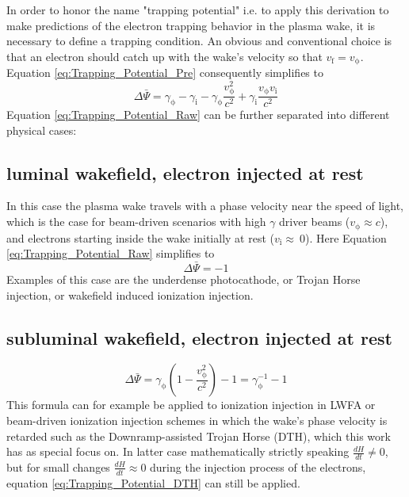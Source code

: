 In order to honor the name "trapping potential" i.e. to apply this derivation to make predictions of the electron trapping behavior in the plasma wake, it is necessary to define a trapping condition. 
An obvious and conventional choice is that an electron should catch up with the wake's velocity so that 
$v_\mathrm{f}=v_\mathrm{\phi}$.
Equation \ref{eq:Trapping_Potential_Pre} consequently simplifies to 
\begin{equation}
\label{eq:Trapping_Potential_Raw}
\Delta \bar{\Psi}= \gamma_\mathrm{\phi}-\gamma_\mathrm{i}-\gamma_\mathrm{\phi}\frac{v_\mathrm{\phi}^2}{c^2}+\gamma_\mathrm{i}\frac{v_\mathrm{\phi}v_\mathrm{i}}{c^2} 
\end{equation}
Equation \ref{eq:Trapping_Potential_Raw} can be further separated into different physical cases:
\subsection*{luminal wakefield, electron injected  at rest}
In this case the plasma wake travels with a phase velocity near the speed of light, which is the case for beam-driven scenarios with high $\gamma$ driver beams ($v_\mathrm{\phi} \approx c$), and electrons starting inside the wake initially at rest ($v_\mathrm{i} \approx \ 0$).
Here Equation \ref{eq:Trapping_Potential_Raw} simplifies to
\begin{equation}
\Delta \bar{\Psi}=-1
\end{equation}
Examples of this case are the underdense photocathode, or Trojan Horse injection\cite{Hidding_PRL_2012}, or wakefield induced ionization injection\cite{MartinezdelaOssa2014231}.
\subsection*{subluminal wakefield, electron injected at rest}

\begin{equation}
\label{eq:Trapping_Potential_DTH}
\Delta \bar{\Psi}=\gamma_\mathrm{\phi}(1-\frac{v_\mathrm{\phi}^2}{c^2})-1=\gamma_\mathrm{\phi}^{-1}-1
\end{equation}
This formula can for example be applied to ionization injection in LWFA\cite{PakPRL2012} or beam-driven ionization injection schemes in which the wake's phase velocity is retarded such as the Downramp-assisted Trojan Horse (DTH)\cite{DTH}, which this work has as special focus on. In latter case mathematically strictly speaking $\frac{d H}{dt}\neq0 $, but for small changes $\frac{dH}{dt}\approx 0$ during the injection process of the electrons, equation \ref{eq:Trapping_Potential_DTH} can still be applied.
